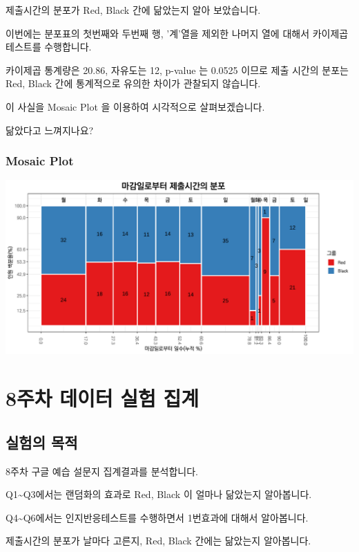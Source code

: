 \documentclass[
]{book}
\begin{document}
제출시간의 분포가 Red, Black 간에 닮았는지 알아 보았습니다.

이번에는 분포표의 첫번째와 두번째 행, '계'열을 제외한 나머지 열에 대해서 카이제곱테스트를 수행합니다.

카이제곱 통계량은 20.86, 자유도는 12, p-value 는 0.0525 이므로 제출 시간의 분포는 Red, Black 간에 통계적으로 유의한 차이가 관찰되지 않습니다.

이 사실을 Mosaic Plot 을 이용하여 시각적으로 살펴보겠습니다.

닮았다고 느껴지나요?

\subsection{Mosaic Plot}\label{mosaic-plot-15}

\includegraphics{Quiz_report_2025_files/figure-latex/unnamed-chunk-212-1.pdf}

\chapter{8주차 데이터 실험 집계}\label{uxc8fcuxcc28-uxb370uxc774uxd130-uxc2e4uxd5d8-uxc9d1uxacc4-7}

\section{실험의 목적}\label{uxc2e4uxd5d8uxc758-uxbaa9uxc801-7}

8주차 구글 예습 설문지 집계결과를 분석합니다.

Q1\textasciitilde Q3에서는 랜덤화의 효과로 Red, Black 이 얼마나 닮았는지 알아봅니다.

Q4\textasciitilde Q6에서는 인지반응테스트를 수행하면서 1번효과에 대해서 알아봅니다.

제출시간의 분포가 날마다 고른지, Red, Black 간에는 닮았는지 알아봅니다.
\end{document}
